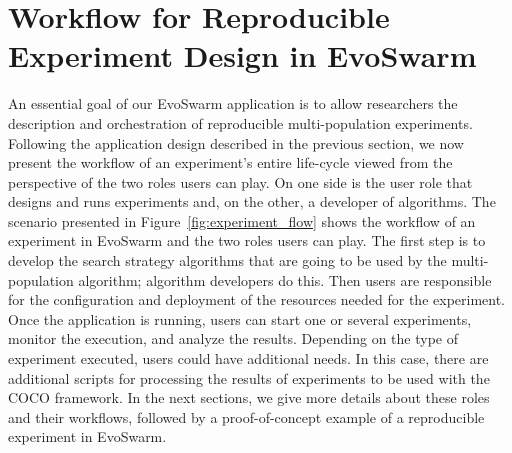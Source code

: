 \documentclass[review]{elsarticle}
\begin{document}
\section{Workflow for Reproducible Experiment Design in EvoSwarm} 
\label{experiment_flow}

An essential goal of our EvoSwarm application is to allow researchers the
description and orchestration of reproducible multi-population experiments.
Following the application design described in the previous section, we now
present the workflow of an experiment's entire life-cycle viewed from the
perspective of the two roles users can play. On one side is the user role that
designs and runs experiments and, on the other, a developer of
algorithms. The scenario presented in Figure~\ref{fig:experiment_flow} shows the
workflow of an experiment in EvoSwarm and the two roles users can play. The first
step is to develop the search strategy algorithms that are going to be used by
the multi-population algorithm; algorithm developers do this. Then users are
responsible for the configuration and deployment of the resources needed for the
experiment. Once the application is running, users can start one or several
experiments, monitor the execution, and analyze the results. Depending on the
type of experiment executed, users could have additional needs. In this case,
there are additional scripts for processing the results of experiments to be
used with the COCO framework. In the next sections, we give more details about
these roles and their workflows, followed by a proof-of-concept example of a
reproducible experiment in EvoSwarm.



  
\end{document}
